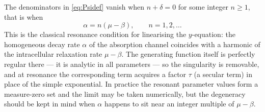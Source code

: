 \begin{remark}[Resonance]
\label{rem:resonance}
The denominators in \cref{eq:Psidef} vanish when $n+\delta=0$ for some integer $n\ge1$,
that is when
\begin{equation*}
\alpha = n(\mu-\beta),\qquad n = 1,2,\dots
\end{equation*}
This is the classical resonance condition for linearising the $y$-equation: the
homogeneous decay rate $\alpha$ of the absorption channel coincides with a harmonic of
the intracellular relaxation rate $\mu-\beta$. The generating function itself is
perfectly regular there --- it is analytic in all parameters --- so the singularity is
removable, and at resonance the corresponding term acquires a factor $\tau$ (a secular
term) in place of the simple exponential. In practice the resonant parameter values form
a measure-zero set and the limit may be taken numerically, but the degeneracy should be
kept in mind when $\alpha$ happens to sit near an integer multiple of $\mu-\beta$.
\end{remark}

\FloatBarrier
